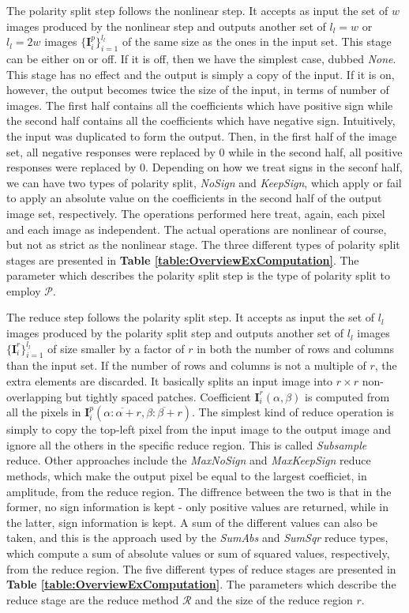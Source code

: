 \documentclass[12pt,a4paper,oneside,english]{UPBThesis}
\newcommand{\hctimes}[2]{{#1}\!\times\!{#2}}
\newcommand{\hcrange}[2]{\overline{{#1}\colon\!\!{#2}}}
\begin{document}
The polarity split step follows the nonlinear step. It accepts as input the set of $w$ images produced by the nonlinear step and outputs another set of $l_l=w$ or $l_l=2w$ images $\{\textbf{I}_i^p\}_{i=1}^{l_l}$ of the same size as the ones in the input set. This stage can be either on or off. If it is off, then we have the simplest case, dubbed \emph{None}. This stage has no effect and the output is simply a copy of the input. If it is on, however, the output becomes twice the size of the input, in terms of number of images. The first half contains all the coefficients which have positive sign while the second half contains all the coefficients which have negative sign. Intuitively, the input was duplicated to form the output. Then, in the first half of the image set, all negative responses were replaced by $0$ while in the second half, all positive responses were replaced by $0$. Depending on how we treat signs in the seconf half, we can have two types of polarity split, \emph{NoSign} and \emph{KeepSign}, which apply or fail to apply an absolute value on the coefficients in the second half of the output image set, respectively. The operations performed here treat, again, each pixel and each image as independent. The actual operations are nonlinear of course, but not as strict as the nonlinear stage. The three different types of polarity split stages are presented in \textbf{Table \ref{table:OverviewExComputation}}. The parameter which describes the polarity split step is the type of polarity split to employ $\mathcal{P}$.

The reduce step follows the polarity split step. It accepts as input the set of $l_l$ images produced by the polarity split step and outputs another set of $l_l$ images $\{\textbf{I}_i^r\}_{i=1}^{l_l}$ of size smaller by a factor of $r$ in both the number of rows and columns than the input set. If the number of rows and columns is not a multiple of $r$, the extra elements are discarded. It basically splits an input image into $\hctimes{r}{r}$ non-overlapping but tightly spaced patches. Coefficient $\textbf{I}_i^r(\alpha,\beta)$ is computed from all the pixels in $\textbf{I}_i^p(\hcrange{\alpha}{\alpha+r},\hcrange{\beta}{\beta+r})$. The simplest kind of reduce operation is simply to copy the top-left pixel from the input image to the output image and ignore all the others in the specific reduce region. This is called \emph{Subsample} reduce. Other approaches include the \emph{MaxNoSign} and \emph{MaxKeepSign} reduce methods, which make the output pixel be equal to the largest coefficiet, in amplitude, from the reduce region. The diffrence between the two is that in the former, no sign information is kept - only positive values are returned, while in the latter, sign information is kept. A sum of the different values can also be taken, and this is the approach used by the \emph{SumAbs} and \emph{SumSqr} reduce types, which compute a sum of absolute values or sum of squared values, respectively, from the reduce region. The five different types of reduce stages are presented in \textbf{Table \ref{table:OverviewExComputation}}. The parameters which describe the reduce stage are the reduce method $\mathcal{R}$ and the size of the reduce region $r$.
\end{document}

